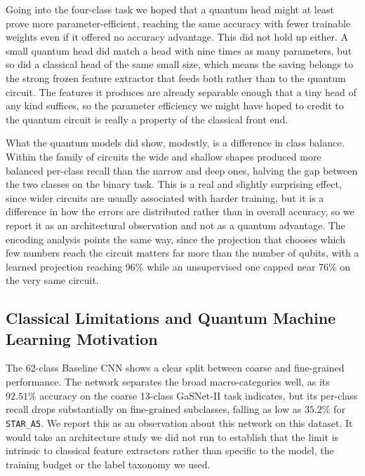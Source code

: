 Going into the four-class task we hoped that a quantum head might at least prove more
parameter-efficient, reaching the same accuracy with fewer trainable weights even if it
offered no accuracy advantage. This did not hold up either. A small quantum head did
match a head with nine times as many parameters, but so did a classical head of the same
small size, which means the saving belongs to the strong frozen feature extractor that
feeds both rather than to the quantum circuit. The features it produces are already
separable enough that a tiny head of any kind suffices, so the parameter efficiency we
might have hoped to credit to the quantum circuit is really a property of the classical
front end.

What the quantum models did show, modestly, is a difference in class balance. Within the
family of circuits the wide and shallow shapes produced more balanced per-class recall
than the narrow and deep ones, halving the gap between the two classes on the binary
task. This is a real and slightly surprising effect, since wider circuits are usually
associated with harder training, but it is a difference in how the errors are
distributed rather than in overall accuracy, so we report it as an architectural
observation and not as a quantum advantage. The encoding analysis points the same way,
since the projection that chooses which few numbers reach the circuit matters far more
than the number of qubits, with a learned projection reaching 96\% while an unsupervised
one capped near 76\% on the very same circuit.
\subsection{Classical Limitations and Quantum Machine Learning Motivation}
The 62-class Baseline CNN shows a clear split between coarse and fine-grained
performance. The network separates the broad macro-categories well, as its
$92.51\%$ accuracy on the coarse 13-class GaSNet-II task indicates, but its
per-class recall drops substantially on fine-grained subclasses, falling as low as
$35.2\%$ for \texttt{STAR\_A5}. We report this as an observation about this
network on this dataset. It would take an architecture study we did not run to
establish that the limit is intrinsic to classical feature extractors rather than
specific to the model, the training budget or the label taxonomy we used.

